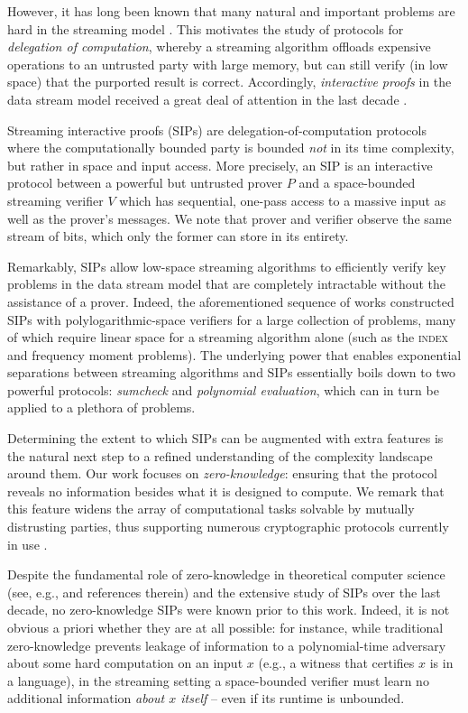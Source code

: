 \documentclass[a4paper,UKenglish,cleveref, autoref, thm-restate]{lipics-v2021}
\theoremstyle{definition}
\newcommand{\indexproblem}{\normalfont\textsc{index}\xspace}
\begin{document}
However, it has long been known that many natural and important problems are hard in the streaming model \cite{AMS99}. This motivates the study of protocols for \emph{delegation of computation}, whereby a streaming algorithm offloads expensive operations to an untrusted party with large memory, but can still verify (in low space) that the purported result is correct.  
Accordingly, \emph{interactive proofs} in the data stream model received a great deal of attention in the last decade \cite{CTY11, CMT12, CMT13, T13, CCGT14, T14, CCMTV15, DTV15, CH18, CG19, CGT20}.

Streaming interactive proofs (SIPs) are delegation-of-computation protocols where the computationally bounded party is bounded \emph{not} in its time complexity, but rather in space and input access. More precisely, an SIP is an interactive protocol between a powerful but untrusted prover $P$ and a space-bounded streaming verifier $V$ which has sequential, one-pass access to a massive input as well as the prover's messages. We note that prover and verifier observe the same stream of bits, which only the former can store in its entirety.

Remarkably, SIPs allow low-space streaming algorithms to efficiently verify key problems in the data stream model that are completely intractable without the assistance of a prover. Indeed, the aforementioned sequence of works constructed SIPs with polylogarithmic-space verifiers for a large collection of problems, many of which require linear space for a streaming algorithm alone (such as the \indexproblem and frequency moment problems). The underlying power that enables exponential separations between streaming algorithms and SIPs essentially boils down to two powerful protocols: \emph{sumcheck} and \emph{polynomial evaluation}, which can in turn be applied to a plethora of problems.

Determining the extent to which SIPs can be augmented with extra features is the natural next step to a refined understanding of the complexity landscape around them. Our work focuses on \emph{zero-knowledge}: ensuring that the protocol reveals no information besides what it is designed to compute. We remark that this feature widens the array of computational tasks solvable by mutually distrusting parties, thus supporting numerous cryptographic protocols currently in use \cite{BCGGMTV14,BBHR18,BCRSVW19}.

Despite the fundamental role of zero-knowledge in theoretical computer science (see, e.g., \cite{V99, G02, V07, G08} and references therein) and the extensive study of SIPs over the last decade, no zero-knowledge SIPs were known prior to this work. Indeed, it is not obvious a priori whether they are at all possible: for instance, while traditional zero-knowledge prevents leakage of information to a polynomial-time adversary about some hard computation on an input $x$ (e.g., a witness that certifies $x$ is in a language), in the streaming setting a space-bounded verifier must learn no additional information \emph{about $x$ itself} -- even if its runtime is unbounded.            
\end{document}
